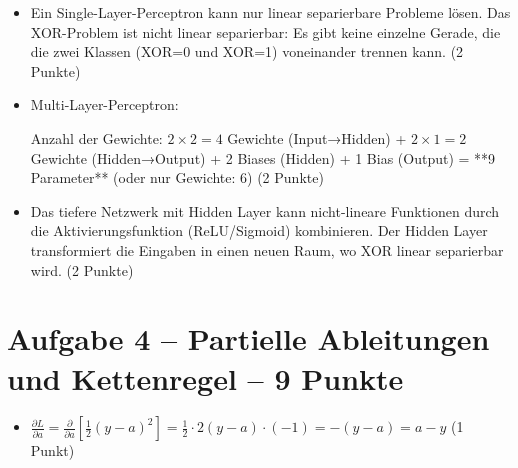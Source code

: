 \begin{itemize}
\item [b)] Ein Single-Layer-Perceptron kann nur linear separierbare Probleme lösen. Das XOR-Problem ist nicht linear separierbar: Es gibt keine einzelne Gerade, die die zwei Klassen (XOR=0 und XOR=1) voneinander trennen kann. (2 Punkte)
\end{itemize}

\begin{itemize}
\item [c)] Multi-Layer-Perceptron:
\begin{center}
\end{center}

Anzahl der Gewichte: $2 \times 2 = 4$ Gewichte (Input→Hidden) + $2 \times 1 = 2$ Gewichte (Hidden→Output) + 2 Biases (Hidden) + 1 Bias (Output) = **9 Parameter** (oder nur Gewichte: 6) (2 Punkte)
\end{itemize}

\begin{itemize}
\item [d)] Das tiefere Netzwerk mit Hidden Layer kann nicht-lineare Funktionen durch die Aktivierungsfunktion (ReLU/Sigmoid) kombinieren. Der Hidden Layer transformiert die Eingaben in einen neuen Raum, wo XOR linear separierbar wird. (2 Punkte)
\end{itemize}

\newpage

\section*{Aufgabe 4 -- Partielle Ableitungen und Kettenregel -- 9 Punkte}

\begin{itemize}
\item [a)] $\frac{\partial L}{\partial a} = \frac{\partial}{\partial a}\left[\frac{1}{2}(y-a)^2\right] = \frac{1}{2} \cdot 2(y-a) \cdot (-1) = -(y-a) = a - y$ (1 Punkt)
\end{itemize}

